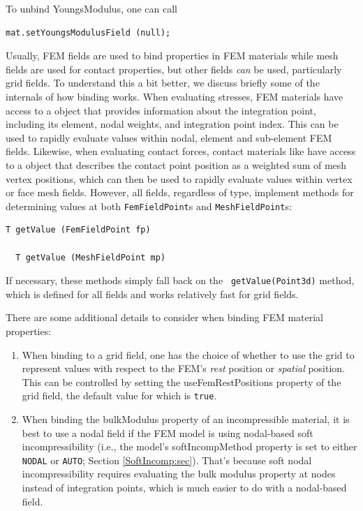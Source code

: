 To unbind {\sf YoungsModulus}, one can call
%
\begin{lstlisting}[]
   mat.setYoungsModulusField (null);
\end{lstlisting}
%

Usually, FEM fields are used to bind properties in FEM materials while
mesh fields are used for contact properties, but other fields {\it
can} be used, particularly grid fields. To understand this a bit
better, we discuss briefly some of the internals of how binding
works. When evaluating stresses, FEM materials have access to a
 object that
provides information about the integration point, including its
element, nodal weights, and integration point index. This can be used
to rapidly evaluate values within nodal, element and sub-element FEM
fields. Likewise, when evaluating contact forces, contact materials
like  have
access to a 
object that describes the contact point position as a weighted sum of
mesh vertex positions, which can then be used to rapidly evaluate
values within vertex or face mesh fields.  However, all
fields, regardless of type, implement methods for determining values
at both {\tt FemFieldPoint}s and {\tt MeshFieldPoint}s:
%
\begin{lstlisting}[]
  T getValue (FemFieldPoint fp)

  T getValue (MeshFieldPoint mp)
\end{lstlisting}
%
If necessary, these methods simply fall back on the {\tt
getValue(Point3d)} method, which is defined for all fields and works
relatively fast for grid fields.

There are some additional details to consider when binding FEM
material properties:

\begin{enumerate}

\item When binding to a grid field, one has the choice of whether to
use the grid to represent values with respect to the FEM's {\it rest}
position or {\it spatial} position. This can be controlled by setting
the {\sf useFemRestPositions} property of the grid field, the default
value for which is {\tt true}.

\item When binding the {\sf bulkModulus} property of an incompressible
material, it is best to use a nodal field if the FEM model is using
nodal-based soft incompressibility (i.e., the model's {\sf
softIncompMethod} property is set to either {\tt NODAL} or {\tt AUTO};
Section \ref{SoftIncomp:sec}). That's because soft nodal
incompressibility requires evaluating the bulk modulus property at
nodes instead of integration points, which is much easier to do with a
nodal-based field.

\end{enumerate}

